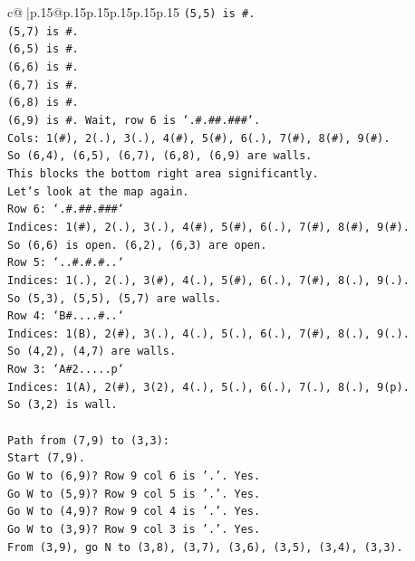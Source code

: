 \documentclass{article}
\begin{document}
{\begin{supertabular}{c@{$\;$}|p{.15\linewidth}@{}p{.15\linewidth}p{.15\linewidth}p{.15\linewidth}p{.15\linewidth}p{.15\linewidth}}
{{{\texttt{(5,5) is \#.} \\
\texttt{(5,7) is \#.} \\
\texttt{(6,5) is \#.} \\
\texttt{(6,6) is \#.} \\
\texttt{(6,7) is \#.} \\
\texttt{(6,8) is \#.} \\
\texttt{(6,9) is \#. Wait, row 6 is `.\#.\#\#.\#\#\#`.} \\
\texttt{Cols: 1(\#), 2(.), 3(.), 4(\#), 5(\#), 6(.), 7(\#), 8(\#), 9(\#).} \\
\texttt{So (6,4), (6,5), (6,7), (6,8), (6,9) are walls.} \\
\texttt{This blocks the bottom right area significantly.} \\
\texttt{Let's look at the map again.} \\
\texttt{Row 6: `.\#.\#\#.\#\#\#`} \\
\texttt{Indices: 1(\#), 2(.), 3(.), 4(\#), 5(\#), 6(.), 7(\#), 8(\#), 9(\#).} \\
\texttt{So (6,6) is open. (6,2), (6,3) are open.} \\
\texttt{Row 5: `..\#.\#.\#..`} \\
\texttt{Indices: 1(.), 2(.), 3(\#), 4(.), 5(\#), 6(.), 7(\#), 8(.), 9(.).} \\
\texttt{So (5,3), (5,5), (5,7) are walls.} \\
\texttt{Row 4: `B\#....\#..`} \\
\texttt{Indices: 1(B), 2(\#), 3(.), 4(.), 5(.), 6(.), 7(\#), 8(.), 9(.).} \\
\texttt{So (4,2), (4,7) are walls.} \\
\texttt{Row 3: `A\#2.....p`} \\
\texttt{Indices: 1(A), 2(\#), 3(2), 4(.), 5(.), 6(.), 7(.), 8(.), 9(p).} \\
\texttt{So (3,2) is wall.} \\
\\ 
\texttt{Path from (7,9) to (3,3):} \\
\texttt{Start (7,9).} \\
\texttt{Go W to (6,9)? Row 9 col 6 is '.'. Yes.} \\
\texttt{Go W to (5,9)? Row 9 col 5 is '.'. Yes.} \\
\texttt{Go W to (4,9)? Row 9 col 4 is '.'. Yes.} \\
\texttt{Go W to (3,9)? Row 9 col 3 is '.'. Yes.} \\
\texttt{From (3,9), go N to (3,8), (3,7), (3,6), (3,5), (3,4), (3,3).} \\
}}}
\end{supertabular}}
\end{document}
